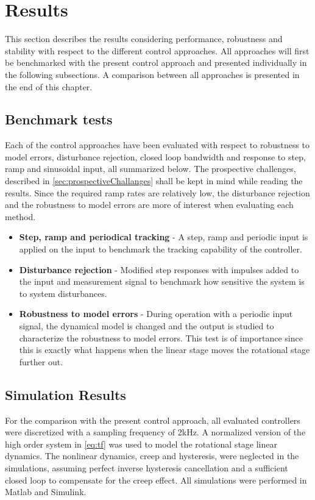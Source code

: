 \chapter{Results}\label{cha:result}
This section describes the results considering performance, robustness and stability with respect to the different control approaches. All approaches will first be benchmarked with the present control approach and presented individually in the following subsections. A comparison between all approaches is presented in the end of this chapter.

\section{Benchmark tests}
Each of the control approaches have been evaluated with respect to robustness to model errors, disturbance rejection, closed loop bandwidth and response to step, ramp and sinusoidal input, all summarized below. The prospective challenges, described in \ref{sec:prospectiveChallanges} shall be kept in mind while reading the results. Since the required ramp rates are relatively low, the disturbance rejection and the robustness to model errors are more of interest when evaluating each method.

\begin{itemize}
\item {\bf Step, ramp and periodical tracking} - A step, ramp and periodic input is applied on the input to benchmark the tracking capability of the controller.
\item {\bf Disturbance rejection} - Modified step responses with impulses added to the input and measurement signal to benchmark how sensitive the system is to system disturbances.
\item {\bf Robustness to model errors} - During operation with a periodic input signal, the dynamical model is changed and the output is studied to characterize the robustness to model errors. This test is of importance since this is exactly what happens when the linear stage moves the rotational stage further out.
\end{itemize}

\section{Simulation Results}
For the comparison with the present control approach, all evaluated controllers were discretized with a sampling frequency of 2kHz. A normalized version of the high order system in \eqref{eq:tf} was used to model the rotational stage linear dynamics. The nonlinear dynamics, creep and hysteresis, were neglected in the simulations, assuming perfect inverse hysteresis cancellation and a sufficient closed loop to compensate for the creep effect. All simulations were performed in Matlab and Simulink.

